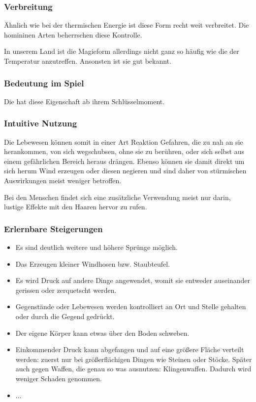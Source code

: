 \subsubsection{Verbreitung}
Ähnlich wie bei der thermischen Energie ist diese Form recht weit verbreitet. Die homininen Arten beherrschen diese Kontrolle. 

In unserem Land ist die Magieform allerdings nicht ganz so häufig wie die der Temperatur anzutreffen. Ansonsten ist sie gut bekannt.

\subsubsection{Bedeutung im Spiel}
Die  hat diese Eigenschaft ab ihrem Schlüsselmoment. 

\subsubsection{Intuitive Nutzung}
Die Lebewesen können somit in einer Art Reaktion Gefahren, die zu nah an sie herankommen, von sich wegschubsen, ohne sie zu berühren, oder sich selbst aus einem gefährlichen Bereich heraus drängen. Ebenso können sie damit direkt um sich herum Wind erzeugen oder diesen negieren und sind daher von stürmischen Auswirkungen meist weniger betroffen.

Bei den Menschen findet sich eine zusätzliche Verwendung meist nur darin, lustige Effekte mit den Haaren hervor zu rufen.

\subsubsection{Erlernbare Steigerungen}
\begin{itemize}
	\item Es sind deutlich weitere und höhere Sprünge möglich.
	\item Das Erzeugen kleiner Windhosen bzw. Staubteufel.
	\item Es wird Druck auf andere Dinge angewendet, womit sie entweder auseinander gerissen oder zerquetscht werden.
	\item Gegenstände oder Lebewesen werden kontrolliert an Ort und Stelle gehalten oder durch die Gegend gedrückt.
	\item Der eigene Körper kann etwas über den Boden schweben.
	\item Einkommender Druck kann abgefangen und auf eine größere Fläche verteilt werden: zuerst nur bei größerflächigen Dingen wie Steinen oder Stöcke. Später auch gegen Waffen, die genau so was ausnutzen: Klingenwaffen. Dadurch wird weniger Schaden genommen.
	\item ...
\end{itemize}

